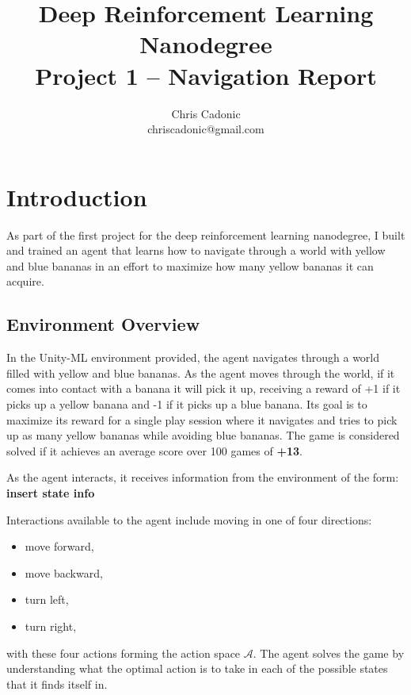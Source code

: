 \documentclass[11pt]{article}
\begin{document}
\title{Deep Reinforcement Learning Nanodegree\\
	   Project 1 -- Navigation Report}
\author{\vspace{-1mm}Chris Cadonic\\
chriscadonic@gmail.com}
\maketitle
\vspace{-1.5em}

\section{Introduction}

As part of the first project for the deep reinforcement learning nanodegree, I built and trained an agent that learns how to navigate through a world with yellow and blue bananas in an effort to maximize how many yellow bananas it can acquire.

\subsection{Environment Overview}

In the Unity-ML environment provided, the agent navigates through a world filled with yellow and blue bananas. As the agent moves through the world, if it comes into contact with a banana it will pick it up, receiving a reward of +1 if it picks up a yellow banana and -1 if it picks up a blue banana. Its goal is to maximize its reward for a single play session where it navigates and tries to pick up as many yellow bananas while avoiding blue bananas. The game is considered solved if it achieves an average score over 100 games of \textbf{+13}.

As the agent interacts, it receives information from the environment of the form:
\textbf{insert state info}

Interactions available to the agent include moving in one of four directions:
\begin{itemize}
	\item move forward,
	\item move backward,
	\item turn left,
	\item turn right,
\end{itemize}
with these four actions forming the action space $\mathcal{A}$. The agent solves the game by understanding what the optimal action is to take in each of the possible states that it finds itself in.
\end{document}
